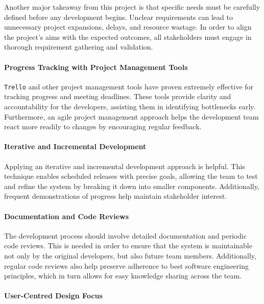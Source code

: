 Another major takeaway from this project is that specific needs must be carefully defined before any development begins. Unclear requirements can lead to unnecessary project expansions, delays, and resource wastage.  In order to align the project's aims with the expected outcomes, all stakeholders must engage in thorough requirement gathering and validation.

\paragraph{Progress Tracking with Project Management Tools}

\texttt{Trello} and other project management tools have proven extremely effective for tracking progress and meeting deadlines. These tools provide clarity and accountability for the developers, assisting them in identifying bottlenecks early. Furthermore, an agile project management approach helps the development team react more readily to changes by encouraging regular feedback.

\paragraph{Iterative and Incremental Development}

Applying an iterative and incremental development approach is helpful. This technique enables scheduled releases with precise goals, allowing the team to test and refine the system by breaking it down into smaller components. Additionally, frequent demonstrations of progress help maintain stakeholder interest.

\paragraph{Documentation and Code Reviews}

The development process should involve detailed documentation and periodic code reviews. This is needed in order to ensure that the system is maintainable not only by the original developers, but also future team members. Additionally, regular code reviews also help preserve adherence to best software engineering principles, which in turn allows for easy knowledge sharing across the team.

\paragraph{User-Centred Design Focus}

